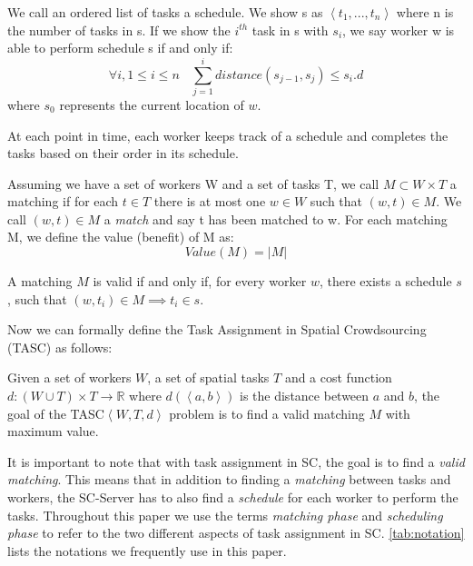 \begin{definition} [Schedule]
We call an ordered list of tasks a schedule. We show s as $\left\langle t_1, ..., t_n \right\rangle$ where n is the number of tasks in s. If we show the $i^{th}$ task in s with $s_i$, we say worker w is able to perform schedule s if and only if:
\begin{equation*}
\forall i, 1\leq i \leq n \ \ \ \ \sum_{j=1}^i distance(s_{j-1}, s_j) \leq s_i.d
\end{equation*}
where $s_0$ represents the current location of $w$.
\end{definition}

At each point in time, each worker keeps track of a schedule and completes the tasks based on their order in its schedule.

\begin{definition} [Matching]
Assuming we have a set of workers W and a set of tasks T, we call $M \subset W \times T$ a matching if for each $t \in T$ there is at most one $w \in W$ such that $\left( w, t \right) \in M$. We call $\left( w, t \right) \in M$ a \emph{match} and say t has been matched to w. For each matching M, we define the value (benefit) of M as:
\begin{equation*}
Value(M) = \vert M \vert
\end{equation*}
\end{definition}

\noindent A matching $M$ is valid if and only if, for every worker $w$, there exists a schedule $s$, such that $(w, t_i) \in M \implies t_i \in s$. 

Now we can formally define the Task Assignment in Spatial Crowdsourcing (TASC) as follows:

\begin{definition}
Given a set of workers $W$, a set of spatial tasks $T$ and a cost function $d: \left( W \cup T \right) \times T \rightarrow \mathbb{R}$ where $d \left( \left\langle a,b \right\rangle \right)$ is the distance between $a$ and $b$, the goal of the TASC$\left\langle W, T, d \right\rangle$ problem is to find a valid matching $M$ with maximum value.
\end{definition}

It is important to note that with task assignment in SC, the goal is to find a \textit{valid matching}. This means that in addition to finding a \textit{matching} between tasks and workers, the SC-Server has to also find a \textit{schedule} for each worker to perform the tasks. Throughout this paper we use the terms \textit{matching phase} and \textit{scheduling phase} to refer to the two different aspects of task assignment in SC. \cref{tab:notation} lists the notations we frequently use in this paper.\\

